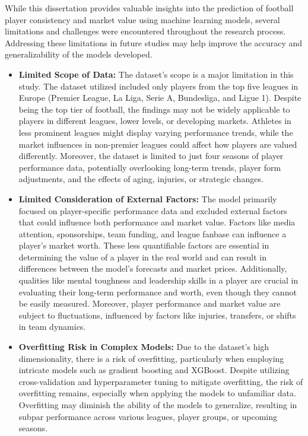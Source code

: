 \documentclass[12pt, a4paper,oneside]{book}
\numberwithin{equation}{section}
\begin{document}
While this dissertation provides valuable insights into the prediction of football player consistency and market value using machine learning models, several limitations and challenges were encountered throughout the research process. Addressing these limitations in future studies may help improve the accuracy and generalizability of the models developed.
\begin{itemize}
    \item \textbf{Limited Scope of Data:} The dataset's scope is a major limitation in this study. The dataset utilized included only players from the top five leagues in Europe (Premier League, La Liga, Serie A, Bundesliga, and Ligue 1). Despite being the top tier of football, the findings may not be widely applicable to players in different leagues, lower levels, or developing markets. Athletes in less prominent leagues might display varying performance trends, while the market influences in non-premier leagues could affect how players are valued differently. Moreover, the dataset is limited to just four seasons of player performance data, potentially overlooking long-term trends, player form adjustments, and the effects of aging, injuries, or strategic changes.
    \item \textbf{Limited Consideration of External Factors:} The model primarily focused on player-specific performance data and excluded external factors that could influence both performance and market value. Factors like media attention, sponsorships, team funding, and league fanbase can influence a player's market worth. These less quantifiable factors are essential in determining the value of a player in the real world and can result in differences between the model's forecasts and market prices. Additionally, qualities like mental toughness and leadership skills in a player are crucial in evaluating their long-term performance and worth, even though they cannot be easily measured. Moreover, player performance and market value are subject to fluctuations, influenced by factors like injuries, transfers, or shifts in team dynamics.
    \item \textbf{Overfitting Risk in Complex Models:} Due to the dataset's high dimensionality, there is a risk of overfitting, particularly when employing intricate models such as gradient boosting and XGBoost. Despite utilizing cross-validation and hyperparameter tuning to mitigate overfitting, the risk of overfitting remains, especially when applying the models to unfamiliar data. Overfitting may diminish the ability of the models to generalize, resulting in subpar performance across various leagues, player groups, or upcoming seasons.

\end{itemize}
\end{document}
